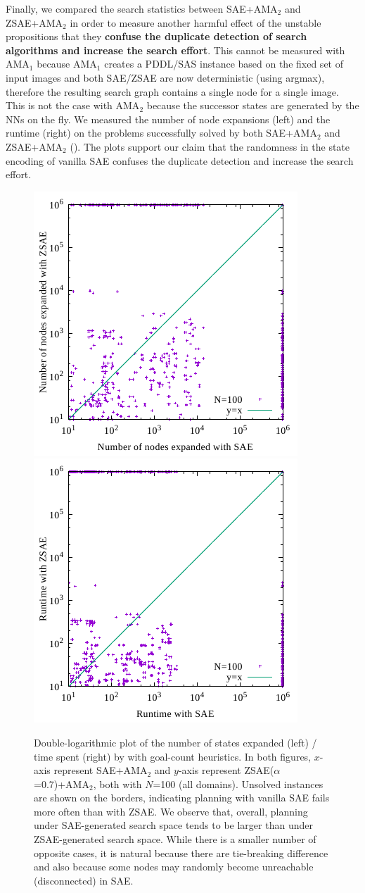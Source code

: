 Finally, we compared the search statistics between SAE+AMA$_2$ and ZSAE+AMA$_2$
in order to measure another harmful effect of the unstable propositions
that they \textbf{confuse the duplicate detection of search algorithms and increase the search effort}.
% 
This cannot be measured with AMA$_1$
because AMA$_1$ creates a PDDL/SAS instance based on the fixed set of
input images and both SAE/ZSAE are now deterministic (using argmax),
therefore the resulting search graph contains a single node for a single image.
This is not the case with AMA$_2$ because the successor states
are generated by the NNs on the fly.
% 
We measured the number of node expansions (left) and the runtime (right)
on the problems successfully solved by both SAE+AMA$_2$ and ZSAE+AMA$_2$ ().
The plots support our claim that
the randomness in the state encoding of vanilla SAE confuses the duplicate detection and
increase the search effort.

\begin{figure}[tb]
 \centering
 \includegraphics[width=0.4\linewidth]{img/static/exp.pdf}
 \includegraphics[width=0.4\linewidth]{img/static/time.pdf}
 \caption{Double-logarithmic plot of the number of states expanded (left) / time spent (right) by
\astar with goal-count heuristics.
In both figures,
$x$-axis represent SAE+AMA$_2$ and
$y$-axis represent ZSAE($\alpha$=0.7)+AMA$_2$, both with $N$=100 (all domains).
Unsolved instances are shown on the borders, indicating planning with vanilla SAE fails more often than with ZSAE.
We observe that, overall, planning under SAE-generated search space tends to be larger
than under ZSAE-generated search space.
While there is a smaller number of opposite cases, it is natural because
there are tie-breaking difference and also because some nodes may randomly become unreachable (disconnected) in SAE.
}
 \label{fig:ama2-statistics}
\end{figure}



